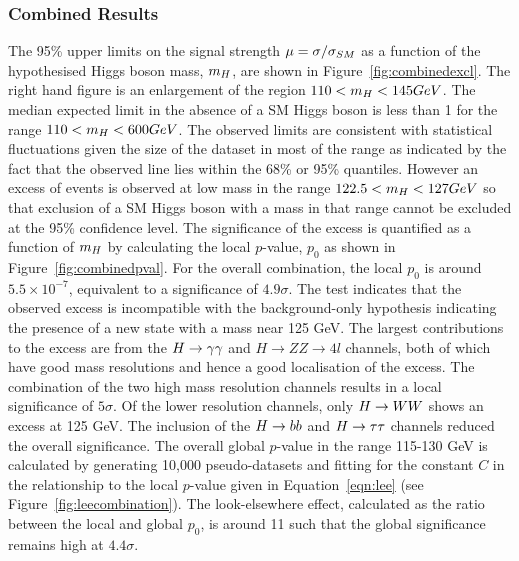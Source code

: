\subsubsection{Combined Results}
\label{sec:combinedsearchresults}
The 95\% upper limits on the signal strength $\mu=\sigma/\sigma_{SM}$ as a function 
of the hypothesised Higgs boson mass, $m_{H}$, are shown in 
Figure~\ref{fig:combinedexcl}. The right hand figure is an enlargement of
the region $110 < m_{H}  < 145 GeV$. The median expected limit in the absence
of a SM Higgs boson is less than 1 for the range $110< m_{H}<600 GeV$. 
The observed limits are consistent with statistical fluctuations given the 
size of the dataset in most of the range as indicated by the fact that the 
observed line lies within the 68\% or 95\% quantiles. However an
excess of events is observed at low mass in the range $122.5  < m_{H} < 127 GeV$
so that exclusion of a SM Higgs boson with a mass in that range cannot be excluded
at the 95\% confidence level. The significance of the excess is quantified as a function
of $m_{H}$ by calculating the local $p$-value, $p_{0}$ as shown in Figure~\ref{fig:combinedpval}. 
For the overall combination, the local $p_{0}$ is around $5.5\times10^{-7}$, 
equivalent to a significance of $4.9\sigma$. The test indicates that the observed excess 
is incompatible with the background-only hypothesis indicating the presence of 
a new state with a mass near 125 GeV.
The largest contributions to the excess are
from the $H\rightarrow\gamma\gamma$ and $H\rightarrow ZZ\rightarrow4l$ channels, 
both of which have good mass resolutions and hence a good localisation
of the excess. The combination of the two 
high mass resolution channels results in a local significance of $5\sigma$. 
Of the lower resolution channels, only $H\rightarrow WW$ shows an excess at 125 GeV. The inclusion
of the $H\rightarrow bb$ and $H\rightarrow\tau\tau$ channels reduced the overall significance.
The overall global $p$-value in the range 115-130 GeV is calculated by 
generating 10,000 pseudo-datasets and fitting for the constant $C$ in 
the relationship to the local $p$-value given in Equation~\ref{eqn:lee} 
(see Figure~\ref{fig:leecombination}). The
look-elsewhere effect, calculated as the ratio between the local and global $p_{0}$, 
is around 11 such that the global significance remains high at $4.4\sigma$.

